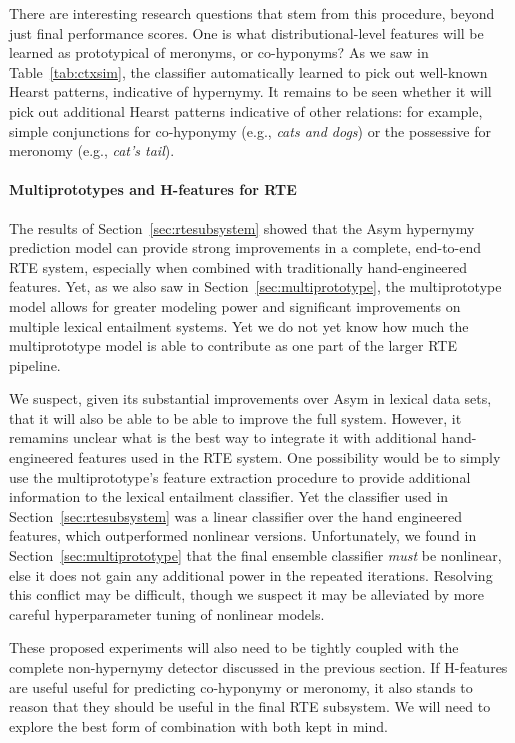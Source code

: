 \documentclass[letterpaper]{article}
\begin{document}
There are interesting research questions that stem from this procedure, beyond
just final performance scores. One is what distributional-level features will
be learned as prototypical of meronyms, or co-hyponyms? As we saw in
Table~\ref{tab:ctxsim}, the classifier automatically learned to pick
out well-known Hearst patterns, indicative of hypernymy. It remains to be seen
whether it will pick out additional Hearst patterns indicative of other
relations: for example, simple conjunctions for co-hyponymy (e.g., {\em cats
and dogs}) or the possessive for meronomy (e.g., {\em cat's tail}).

\paragraph{Multiprototypes and H-features for RTE}

The results of Section~\ref{sec:rtesubsystem} showed that the Asym hypernymy
prediction model can provide strong improvements in a complete, end-to-end RTE
system, especially when combined with traditionally hand-engineered features.
Yet, as we also saw in Section~\ref{sec:multiprototype}, the multiprototype
model allows for greater modeling power and significant improvements on multiple
lexical entailment systems. Yet we do not yet know how much the multiprototype
model is able to contribute as one part of the larger RTE pipeline.

We suspect, given its substantial improvements over Asym in lexical data sets,
that it will also be able to be able to improve the full system. However, it
remamins unclear what is the best way to integrate it with additional
hand-engineered features used in the RTE system.  One possibility would be to
simply use the multiprototype's feature extraction procedure to provide
additional information to the lexical entailment classifier. Yet the classifier
used in Section~\ref{sec:rtesubsystem} was a linear classifier over the hand
engineered features, which outperformed nonlinear versions. Unfortunately, we
found in Section~\ref{sec:multiprototype} that the final ensemble classifier
{\em must} be nonlinear, else it does not gain any additional power in the
repeated iterations. Resolving this conflict may be difficult, though we
suspect it may be alleviated by more careful hyperparameter tuning of nonlinear
models.

These proposed experiments will also need to be tightly coupled with the
complete non-hypernymy detector discussed in the previous section. If H-features
are useful useful for predicting co-hyponymy or meronomy, it also stands to
reason that they should be useful in the final RTE subsystem. We will need to
explore the best form of combination with both kept in mind.
\end{document}
